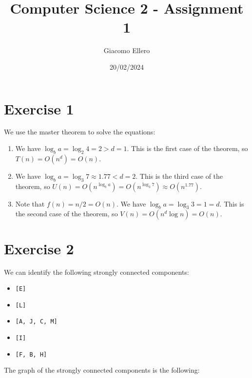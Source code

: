 \documentclass[10pt]{article}
\title{Computer Science 2 - Assignment 1}
\author{Giacomo Ellero}
\date{20/02/2024}
\begin{document}

\section*{Exercise 1}

We use the master theorem to solve the equations:

\begin{enumerate}
    \item We have $\log_b a = \log_2 4 = 2 > d = 1$. This is the first case of the theorem, so $T(n) = O(n^d) = O(n)$.
    \item We have $\log_b a = \log_3 7 \approx 1.77 < d = 2$. This is the third case of the theorem, so $U(n) = O(n^{\log_b a}) = O(n^{\log_3 7}) \approx O(n^{1.77})$.
    \item Note that $f(n) = n/2 = O(n)$. We have $\log_b a = \log_3 3 = 1 = d$. This is the second case of the theorem, so $V(n) = O(n^d \log n) = O(n)$.
\end{enumerate}

\section*{Exercise 2}

We can identify the following strongly connected components:
\begin{itemize}
    \item \texttt{[E]}
    \item \texttt{[L]}
    \item \texttt{[A, J, C, M]}
    \item \texttt{[I]}
    \item \texttt{[F, B, H]}
\end{itemize}

The graph of the strongly connected components is the following:

\begin{center}
\end{center}
\end{document}
